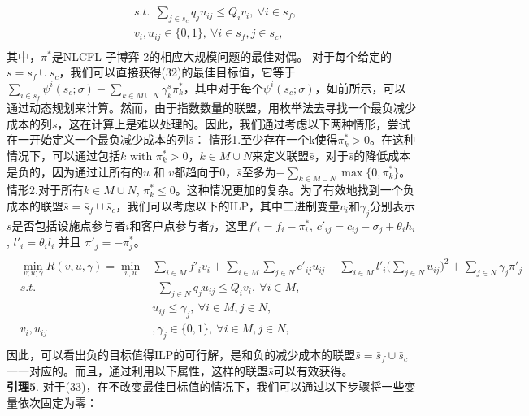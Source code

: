 \documentclass[UTF8]{article}
\begin{document}
\begin{定义}
\begin{eqnarray}
\begin{aligned}
\begin{split}
      &s.t. ~~\sum_{j \in s_c}q_ju_{ij} \leq Q_iv_i, ~\forall i \in s_f,\\
      &v_i, u_{ij} \in \big\{0,1\big\},~\forall i \in s_f, j \in s_c,
      \end{split}
      \end{aligned}
      \end{eqnarray}
      其中，$\pi^*$是NLCFL 子博弈 2的相应大规模问题的最佳对偶。
      对于每个给定的$s=s_f\cup s_c$，我们可以直接获得(32)的最佳目标值，它等于$\sum_{i\in s_f}\psi^{i}(s_c;\sigma)-\sum_{k \in M \cup N} \gamma^s_k \pi_k^*$，其中对于每个$\psi^{i}(s_c;\sigma)$，如前所示，可以通过动态规划来计算。然而，由于指数数量的联盟，用枚举法去寻找一个最负减少成本的列$s$，这在计算上是难以处理的。因此，我们通过考虑以下两种情形，尝试在一开始定义一个最负减少成本的列$\bar{s}$：
      情形1.至少存在一个k使得$\pi^*_k>0$。在这种情况下，可以通过包括$k$ with $\pi^*_k>0$，$k\in M \cup N$来定义联盟$\bar s$，对于$\bar s$的降低成本是负的，因为通过让所有的$u$ 和 $v$都趋向于0，$\bar s$至多为$-\sum_{k\in M\cup N} \max\{0, \pi^*_k\}$。
      情形2.对于所有$k\in M\cup N$,  $\pi^*_k \leq 0$。这种情况更加的复杂。为了有效地找到一个负成本的联盟$\bar s = \bar{s}_f \cup \bar{s}_c$，我们可以考虑以下的ILP，其中二进制变量$v_i$和$\gamma_j$分别表示$\bar{s}$是否包括设施点参与者$i$和客户点参与者$j$，这里$f'_i = f_i - \pi_i^*$, $c'_{ij} = c_{ij}-\sigma_j + \theta_ih_i$, $l'_i = \theta_il_i$ 并且 $\pi'_j = -\pi_j^*$。
      \begin{eqnarray}\label{eqn:pricing2nonlinear}
      \begin{aligned}
      \begin{split}
      \min_{v;u;\gamma} R(v,u,\gamma) = \min_{v,u} &\sum_{i \in M} f'_i v_i + \sum_{i \in M}\sum_{j \in N} c'_{ij}u_{ij} - \sum_{i \in M} l'_i \big(\sum_{j \in N}u_{ij}\big)^2+ \sum_{j \in N} \gamma_j \pi'_j\\
      s.t.&~~\sum_{j \in N}q_ju_{ij} \leq Q_iv_i, ~\forall i \in M,\\
      &u_{ij} \leq \gamma_j,~\forall i \in M, j \in N,\\
      v_i, u_{ij}&, \gamma_j \in \big\{0,1\big\},~\forall i \in M, j \in N,
      \end{split}
      \end{aligned}
      \end{eqnarray}
      因此，可以看出负的目标值得ILP的可行解，是和负的减少成本的联盟$\bar{s} =  \bar{s}_f \cup \bar{s}_c$一一对应的。而且，通过利用以下属性，这样的联盟$\bar{s}$可以有效获得。\\
      \textbf{引理5}. 对于(33)，在不改变最佳目标值的情况下，我们可以通过以下步骤将一些变量依次固定为零：

\end{定义}
\end{document}
